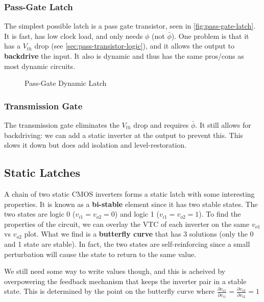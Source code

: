\documentclass[11pt]{report}
\begin{document}
\subsubsection{Pass-Gate Latch}
The simplest possible latch is a pass gate transistor, seen in \autoref{fig:pass-gate-latch}. It is fast, has low clock load, and only needs $\phi$ (not $\bar{\phi}$). One problem is that it has a $V_{th}$ drop (see \autoref{sec:pass-transistor-logic}), and it allows the output to \textbf{backdrive} the input. It also is dynamic and thus has the same pros/cons as most dynamic circuits.


\begin{figure}[h]
\centering
{}
\caption{Pass-Gate Dynamic Latch}\label{fig:pass-gate-latch}
\end{figure}

\subsubsection{Transmission Gate}
The transmission gate eliminates the $V_{th}$ drop and requires $\bar{\phi}$. It still allows for backdriving: we can add a static inverter at the output to prevent this. This slows it down but does add isolation and level-restoration.

\subsection{Static Latches}\label{sec:static-latch}
A chain of two static CMOS inverters forms a static latch with some interesting properties. It is known as a \textbf{bi-stable} element since it has two stable states. The two states are logic 0 ($v_{i1} = v_{o2} = 0$) and logic 1 ($v_{i1} = v_{o2} = 1$). To find the properties of the circuit, we can overlay the VTC of each inverter on the same $v_{o1}$ vs $v_{o2}$ plot. What we find is a \textbf{butterfly curve} that has 3 solutions (only the 0 and 1 state are stable). In fact, the two states are self-reinforcing since a small perturbation will cause the state to return to the same value.

We still need some way to write values though, and this is acheived by overpowering the feedback mechanism that keeps the inverter pair in a stable state. This is determined by the point on the butterfly curve where $\frac{\partial v_{o1}}{\partial v_{i1}} = \frac{\partial v_{o2}}{\partial v_{i2}} = 1$
\end{document}

